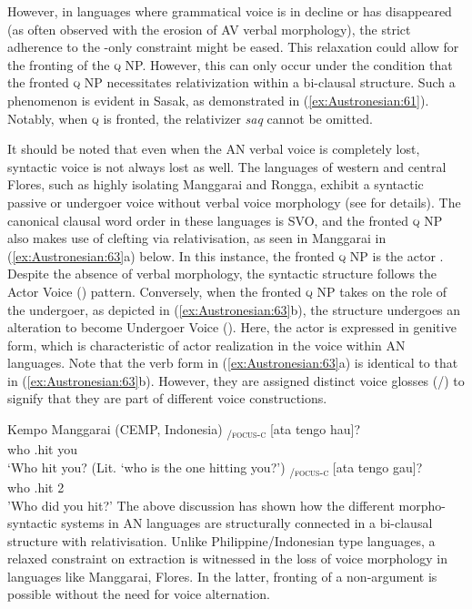 \documentclass[output=paper,chinesefont]{../langscibook}
\begin{document}
However, in languages where grammatical voice is in decline or has disappeared (as often observed with the erosion of AV verbal morphology), the strict adherence to the \SUBJ-only constraint might be eased. This relaxation could allow for the fronting of the \OBJ \textsc{q} NP. However, this can only occur under the condition that the fronted \OBJ \textsc{q} NP necessitates relativization within a bi-clausal structure. Such a phenomenon is evident in Sasak, as demonstrated in (\ref{ex:Austronesian:61}). Notably, when \OBJ \textsc{q} is fronted, the relativizer \emph{saq} cannot be omitted.


It should be noted that even when the AN verbal voice is completely lost, syntactic voice is not always lost as well. The languages of western and central Flores, such as highly isolating Manggarai and Rongga, exhibit a syntactic passive or undergoer voice without verbal voice morphology (see \citealt{Arka2005a} for details). The canonical clausal word order in these languages is SVO, and the fronted \textsc{q} NP also makes use of clefting via relativisation, as seen in Manggarai in (\ref{ex:Austronesian:63}a) below. In this instance, the fronted \textsc{q} NP is the actor \SUBJ. Despite the absence of \AV verbal morphology, the syntactic structure follows the Actor Voice (\AV) pattern. Conversely, when the fronted \textsc{q} NP takes on the role of the undergoer, as depicted in (\ref{ex:Austronesian:63}b), the structure undergoes an alteration to become Undergoer Voice (\UV). Here, the actor is expressed in genitive form, which is characteristic of actor realization in the \UV voice within AN languages. Note that the verb form in (\ref{ex:Austronesian:63}a) is identical to that in (\ref{ex:Austronesian:63}b). However, they are assigned distinct voice glosses (\AV/\UV) to signify that they are part of different voice constructions. 

\ea\label{ex:Austronesian:63} Kempo Manggarai (CEMP, Indonesia) 
\ea\gll
[Cai]\textsubscript{\PRED/\textsc{focus-c}} [ata tengo hau]\textsubscript{\SUBJ}? \\
\phantom{[}who \phantom{[}{\REL} \AV.hit you\\
\glt`Who hit you? (Lit. `who is the one hitting you?') \citep[63]{Semiun1993}
\ex\gll
[Cai]\textsubscript{\PRED/\textsc{focus-c}}  [ata   tengo  gau]?\\
who \phantom{[}{\REL} \UV.hit   2\GEN\\
\glt'Who did you hit?' \citep[64]{Semiun1993}
\z\z
The above discussion has shown how the different morpho-syntactic systems in AN languages are structurally connected in a bi-clausal structure with relativisation. Unlike Philippine/Indonesian type languages, a relaxed constraint on extraction is witnessed in the loss of voice morphology in languages like Manggarai, Flores. In the latter, fronting of a non-\SUBJ argument is possible without the need for voice alternation.
\end{document}
